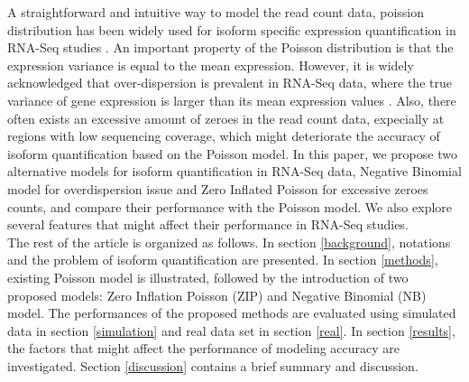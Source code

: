 \documentclass[11pt]{article}
\begin{document}
A straightforward and intuitive way to model the read count data, poission distribution has been widely used for isoform specific expression quantification in RNA-Seq studies \cite{jiang2009statistical, hu2012using}. 
An important property of the Poisson distribution is that the expression variance is equal to the mean expression. However, it is widely acknowledged that over-dispersion is prevalent in RNA-Seq data, where the true variance of gene expression is larger 
than its mean expression values \cite{anders2010differential}. Also, there often exists an excessive amount of zeroes in the read count data, expecially at regions with low sequencing coverage, which might deteriorate the accuracy of isoform quantification 
based on the Poisson model. In this paper, we propose two alternative models for isoform quantification in RNA-Seq data, Negative Binomial model for overdispersion issue and Zero Inflated Poisson for excessive zeroes counts, and compare their performance with the Poisson model. 
We also explore several features that might affect their performance in RNA-Seq studies. 
\\


The rest of the article is organized as follows. In section \ref{background}, notations and the problem of isoform quantification are presented. In section \ref{methods}, existing Poisson model is illustrated, followed by the introduction of two proposed models: Zero Inflation Poisson (ZIP) and Negative Binomial (NB) model. The performances of the proposed methods are evaluated using simulated data in section \ref{simulation} and real data set in section \ref{real}.  In section \ref{results}, the factors that might affect the performance of modeling accuracy are investigated. Section \ref{discussion} contains a brief summary and discussion. 
\end{document}
